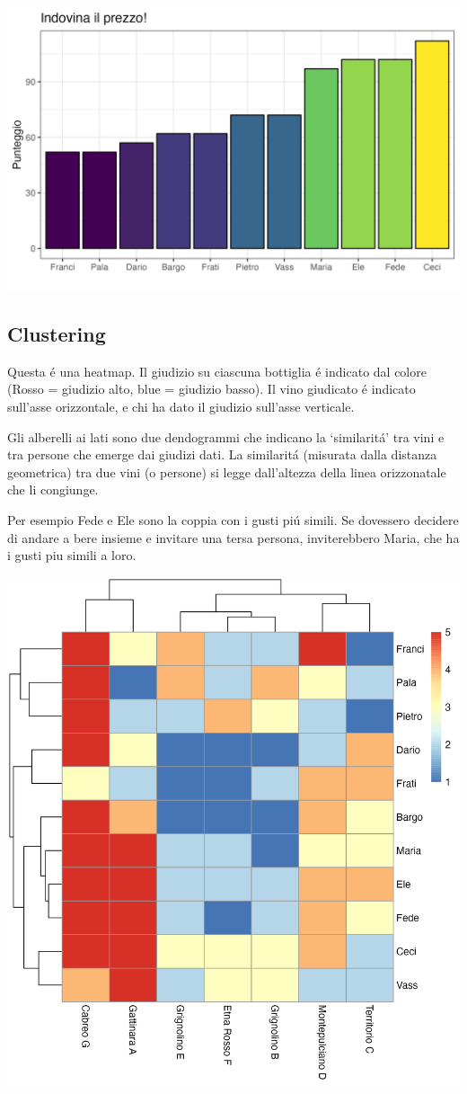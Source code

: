 \documentclass[
]{article}
\begin{document}
\includegraphics[width=1\linewidth]{plots/auction_rank}

\hypertarget{clustering}{%
\subsection{Clustering}\label{clustering}}

Questa é una heatmap. Il giudizio su ciascuna bottiglia é indicato dal
colore (Rosso = giudizio alto, blue = giudizio basso). Il vino giudicato
é indicato sull'asse orizzontale, e chi ha dato il giudizio sull'asse
verticale.

Gli alberelli ai lati sono due dendogrammi che indicano la `similaritá'
tra vini e tra persone che emerge dai giudizi dati. La similaritá
(misurata dalla distanza geometrica) tra due vini (o persone) si legge
dall'altezza della linea orizzonatale che li congiunge.

Per esempio Fede e Ele sono la coppia con i gusti piú simili. Se
dovessero decidere di andare a bere insieme e invitare una tersa
persona, inviterebbero Maria, che ha i gusti piu simili a loro.

\includegraphics[width=1\linewidth]{plots/heatmap}
\end{document}

